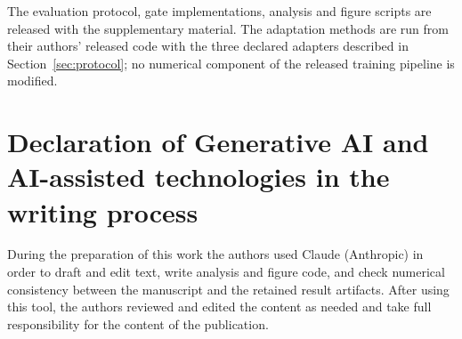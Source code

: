 The evaluation protocol, gate implementations, analysis and figure scripts are released with the supplementary material.
The adaptation methods are run from their authors' released code with the three declared adapters described in
Section~\ref{sec:protocol}; no numerical component of the released training pipeline is modified.

\section*{Declaration of Generative AI and AI-assisted technologies in the writing process}

During the preparation of this work the authors used Claude (Anthropic) in order to draft and edit text, write analysis and
figure code, and check numerical consistency between the manuscript and the retained result artifacts. After using this
tool, the authors reviewed and edited the content as needed and take full responsibility for the content of the
publication.
